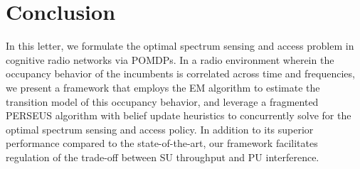 \documentclass[12pt, draftcls, onecolumn]{IEEEtran}
\begin{document}
\section{Conclusion}\label{V}
In this letter, we formulate the optimal spectrum sensing and access problem in cognitive radio networks via POMDPs. In a radio environment wherein the occupancy behavior of the incumbents is correlated across time and frequencies, we present a framework that employs the EM algorithm to estimate the transition model of this occupancy behavior, and leverage a fragmented PERSEUS algorithm with belief update heuristics to concurrently solve for the optimal spectrum sensing and access policy. In addition to its superior performance compared to the state-of-the-art, our framework facilitates regulation of the trade-off between SU throughput and PU interference.


\end{document}
